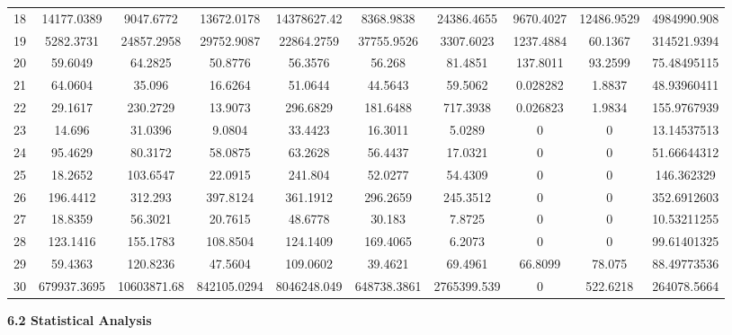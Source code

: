 \documentclass[
]{article}
\begin{document}
\begin{justify}
{\begin{table}[h!]
\begin{tabular}{||c c c c c c c c c c||}
18 & 14177.0389 & 9047.6772 & 13672.0178 & 14378627.42 & 8368.9838 & 24386.4655 & 9670.4027 & 12486.9529 & 4984990.908 \\
19 & 5282.3731 & 24857.2958 & 29752.9087 & 22864.2759 & 37755.9526 & 3307.6023 & 1237.4884 & 60.1367 & 314521.9394 \\
20 & 59.6049 & 64.2825 & 50.8776 & 56.3576 & 56.268 & 81.4851 & 137.8011 & 93.2599 & 75.48495115 \\
21 & 64.0604 & 35.096 & 16.6264 & 51.0644 & 44.5643 & 59.5062 & 0.028282 & 1.8837 & 48.93960411 \\
22 & 29.1617 & 230.2729 & 13.9073 & 296.6829 & 181.6488 & 717.3938 & 0.026823 & 1.9834 & 155.9767939 \\
23 & 14.696 & 31.0396 & 9.0804 & 33.4423 & 16.3011 & 5.0289 & 0 & 0 & 13.14537513 \\
24 & 95.4629 & 80.3172 & 58.0875 & 63.2628 & 56.4437 & 17.0321 & 0 & 0 & 51.66644312 \\
25 & 18.2652 & 103.6547 & 22.0915 & 241.804 & 52.0277 & 54.4309 & 0 & 0 & 146.362329 \\
26 & 196.4412 & 312.293 & 397.8124 & 361.1912 & 296.2659 & 245.3512 & 0 & 0 & 352.6912603 \\
27 & 18.8359 & 56.3021 & 20.7615 & 48.6778 & 30.183 & 7.8725 & 0 & 0 & 10.53211255 \\
28 & 123.1416 & 155.1783 & 108.8504 & 124.1409 & 169.4065 & 6.2073 & 0 & 0 & 99.61401325 \\
29 & 59.4363 & 120.8236 & 47.5604 & 109.0602 & 39.4621 & 69.4961 & 66.8099 & 78.075 & 88.49773536 \\
30 & 679937.3695 & 10603871.68 & 842105.0294 & 8046248.049 & 648738.3861 & 2765399.539 & 0 & 522.6218 & 264078.5664 \\


\hline
\end{tabular}
\end{table}






\newpage
\textbf{6.2 Statistical Analysis}

\vspace{1mm}

}
\end{justify}
\end{document}
